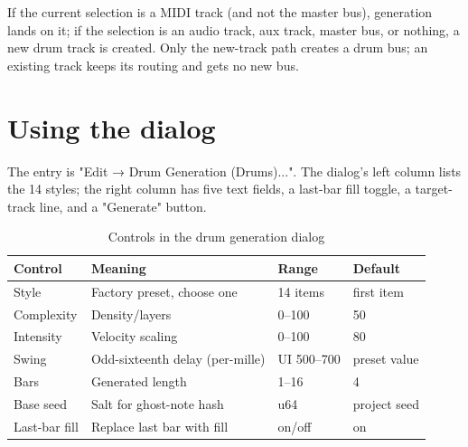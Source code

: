 If the current selection is a MIDI track (and not the master bus), generation lands on it; if the selection is an audio track, aux track, master bus, or nothing, a new drum track is created. Only the new-track path creates a drum bus; an existing track keeps its routing and gets no new bus.

\begin{center}
\end{center}

\section{Using the dialog}

The entry is "Edit → Drum Generation (Drums)...". The dialog's left column lists the 14 styles; the right column has five text fields, a last-bar fill toggle, a target-track line, and a "Generate" button.

\begin{table}[htbp]
\centering
\small
\begin{tabular}{@{}llll@{}}
\hline
Control & Meaning & Range & Default \\
\hline
Style & Factory preset, choose one & 14 items & first item \\
Complexity & Density/layers & 0–100 & 50 \\
Intensity & Velocity scaling & 0–100 & 80 \\
Swing & Odd-sixteenth delay (per-mille) & UI 500–700 & preset value \\
Bars & Generated length & 1–16 & 4 \\
Base seed & Salt for ghost-note hash & u64 & project seed \\
Last-bar fill & Replace last bar with fill & on/off & on \\
\hline
\end{tabular}
\caption{Controls in the drum generation dialog}
\label{tab:drum-dialog}
\end{table}

